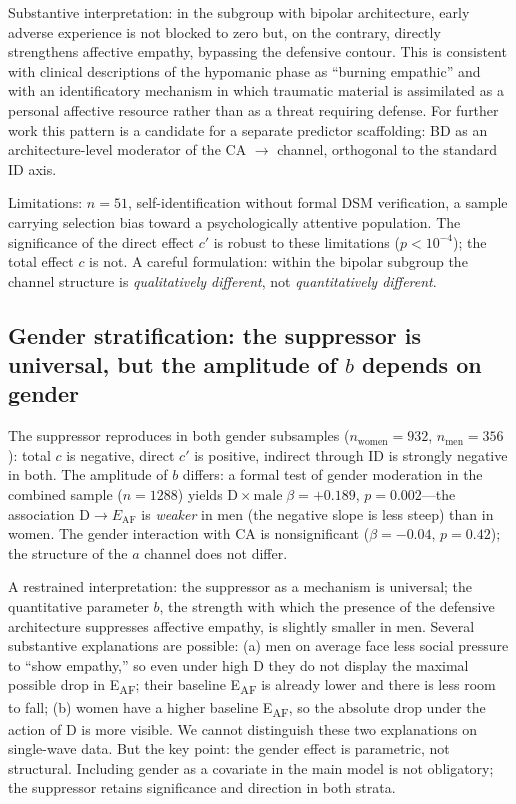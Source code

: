 Substantive interpretation: in the subgroup with bipolar architecture, early adverse experience is not blocked to zero but, on the contrary, directly strengthens affective empathy, bypassing the defensive contour. This is consistent with clinical descriptions of the hypomanic phase as ``burning empathic'' and with an identificatory mechanism in which traumatic material is assimilated as a personal affective resource rather than as a threat requiring defense. For further work this pattern is a candidate for a separate predictor scaffolding: BD as an architecture-level moderator of the CA $\to$ \EAF{} channel, orthogonal to the standard ID axis.

Limitations: $n=51$, self-identification without formal DSM verification, a sample carrying selection bias toward a psychologically attentive population. The significance of the direct effect $c'$ is robust to these limitations ($p < 10^{-4}$); the total effect $c$ is not. A careful formulation: within the bipolar subgroup the channel structure is \emph{qualitatively different}, not \emph{quantitatively different}.

\subsection{Gender stratification: the suppressor is universal, but the amplitude of $b$ depends on gender}
\label{subsec:gender_moderation}

The suppressor reproduces in both gender subsamples ($n_\mathrm{women} = 932$, $n_\mathrm{men} = 356$): total $c$ is negative, direct $c'$ is positive, indirect through ID is strongly negative in both. The amplitude of $b$ differs: a formal test of gender moderation in the combined sample ($n = 1288$) yields $\mathrm{D}\times\mathrm{male} \; \beta = +0.189$, $p = 0.002$---the association $\mathrm{D} \to E_{\mathrm{AF}}$ is \emph{weaker} in men (the negative slope is less steep) than in women. The gender interaction with CA is nonsignificant ($\beta = -0.04$, $p = 0.42$); the structure of the $a$ channel does not differ.

A restrained interpretation: the suppressor as a mechanism is universal; the quantitative parameter $b$, the strength with which the presence of the defensive architecture suppresses affective empathy, is slightly smaller in men. Several substantive explanations are possible: (a) men on average face less social pressure to ``show empathy,'' so even under high D they do not display the maximal possible drop in E\textsubscript{AF}; their baseline E\textsubscript{AF} is already lower and there is less room to fall; (b) women have a higher baseline E\textsubscript{AF}, so the absolute drop under the action of D is more visible. We cannot distinguish these two explanations on single-wave data. But the key point: the gender effect is parametric, not structural. Including gender as a covariate in the main model is not obligatory; the suppressor retains significance and direction in both strata.

